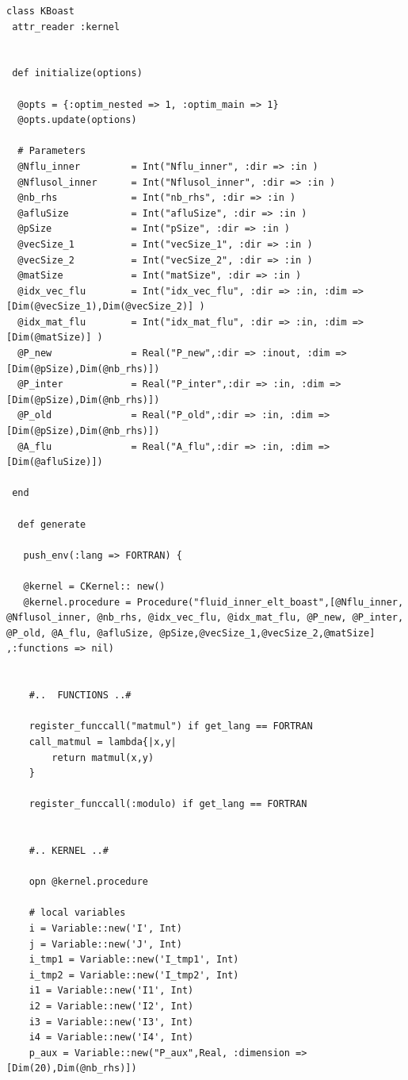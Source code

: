 \documentclass[10pt,twoside]{article}   	%
\begin{document}
\lstset{language=RUBY}
\begin{lstlisting}[caption=KBoast.rb]
class KBoast
 attr_reader :kernel


 def initialize(options)

  @opts = {:optim_nested => 1, :optim_main => 1}
  @opts.update(options)

  # Parameters 
  @Nflu_inner         = Int("Nflu_inner", :dir => :in )
  @Nflusol_inner      = Int("Nflusol_inner", :dir => :in )
  @nb_rhs             = Int("nb_rhs", :dir => :in )
  @afluSize           = Int("afluSize", :dir => :in )
  @pSize              = Int("pSize", :dir => :in )
  @vecSize_1          = Int("vecSize_1", :dir => :in )
  @vecSize_2          = Int("vecSize_2", :dir => :in )
  @matSize            = Int("matSize", :dir => :in )
  @idx_vec_flu        = Int("idx_vec_flu", :dir => :in, :dim => [Dim(@vecSize_1),Dim(@vecSize_2)] )
  @idx_mat_flu        = Int("idx_mat_flu", :dir => :in, :dim => [Dim(@matSize)] )
  @P_new              = Real("P_new",:dir => :inout, :dim => [Dim(@pSize),Dim(@nb_rhs)])
  @P_inter            = Real("P_inter",:dir => :in, :dim => [Dim(@pSize),Dim(@nb_rhs)])
  @P_old              = Real("P_old",:dir => :in, :dim => [Dim(@pSize),Dim(@nb_rhs)])
  @A_flu              = Real("A_flu",:dir => :in, :dim => [Dim(@afluSize)])

 end
 
  def generate

   push_env(:lang => FORTRAN) {

   @kernel = CKernel:: new()
   @kernel.procedure = Procedure("fluid_inner_elt_boast",[@Nflu_inner, @Nflusol_inner, @nb_rhs, @idx_vec_flu, @idx_mat_flu, @P_new, @P_inter, @P_old, @A_flu, @afluSize, @pSize,@vecSize_1,@vecSize_2,@matSize] ,:functions => nil)


    #..  FUNCTIONS ..#

    register_funccall("matmul") if get_lang == FORTRAN
    call_matmul = lambda{|x,y|
        return matmul(x,y)
    }

    register_funccall(:modulo) if get_lang == FORTRAN


    #.. KERNEL ..#

    opn @kernel.procedure

    # local variables
    i = Variable::new('I', Int)
    j = Variable::new('J', Int)
    i_tmp1 = Variable::new('I_tmp1', Int)
    i_tmp2 = Variable::new('I_tmp2', Int)
    i1 = Variable::new('I1', Int)
    i2 = Variable::new('I2', Int)
    i3 = Variable::new('I3', Int)
    i4 = Variable::new('I4', Int)
    p_aux = Variable::new("P_aux",Real, :dimension => [Dim(20),Dim(@nb_rhs)])


\end{lstlisting}
\end{document}
